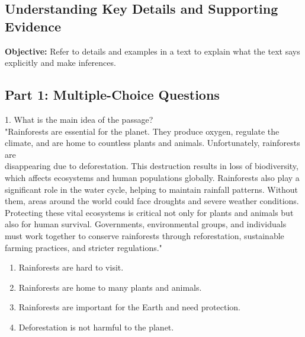 \documentclass[12pt]{article}
\begin{document}
\subsection*{Understanding Key Details and Supporting Evidence}
\onehalfspacing

\begin{tcolorbox}[colframe=black!40, colback=gray!0, title=Learning Objective]
\textbf{Objective:} Refer to details and examples in a text to explain what the text says explicitly and make inferences.
\end{tcolorbox}

\subsection*{Part 1: Multiple-Choice Questions}

1. What is the main idea of the passage?\\
"Rainforests are essential for the planet. They produce oxygen, regulate the climate, and are home to countless plants and animals. Unfortunately, rainforests are \\disappearing due to deforestation. This destruction results in loss of biodiversity, which affects ecosystems and human populations globally. Rainforests also play a significant role in the water cycle, helping to maintain rainfall patterns. Without them, areas around the world could face droughts and severe weather conditions. Protecting these vital ecosystems is critical not only for plants and animals but also for human survival. Governments, environmental groups, and individuals must work together to conserve rainforests through reforestation, sustainable farming practices, and stricter regulations."\\
\begin{enumerate}[label=\Alph*.]
    \item Rainforests are hard to visit.  
    \item Rainforests are home to many plants and animals.  
    \item Rainforests are important for the Earth and need protection.  
    \item Deforestation is not harmful to the planet.  
\end{enumerate}
\end{document}
